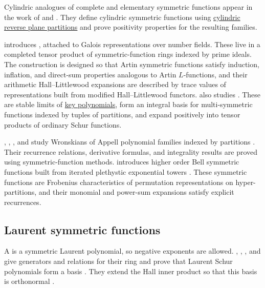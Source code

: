 Cylindric analogues of complete and elementary symmetric functions appear in
the work of  and 
\cite{KorffPalazzo2020}.  They define cylindric symmetric functions using
\hyperref[planePartitions]{cylindric reverse plane partitions} and prove
positivity properties for the resulting families.

 introduces
\label{artinSymmetricFunction}
\cite{Weising2024Artinx}, attached to Galois representations over number fields.
These live in a completed tensor product of symmetric-function rings indexed
by prime ideals.  The construction is designed so that Artin symmetric
functions satisfy induction, inflation, and direct-sum properties analogous
to Artin $L$-functions, and their arithmetic Hall--Littlewood expansions are
described by trace values of representations built from modified
Hall--Littlewood functors.
 also studies
\label{multiSymmetricSchurFunction}
\cite{Weising2025x}.  These are stable limits of \hyperref[key]{key polynomials},
form an integral basis for multi-symmetric functions indexed by tuples of
partitions, and expand positively into tensor products of ordinary Schur
functions.

, , , and
 study Wronskians of Appell polynomial families indexed
by partitions \cite{BonneuxHamakerStembridgeStevens2019}.  Their recurrence
relations, derivative formulas, and integrality results are proved using
symmetric-function methods.
 introduces higher
order Bell symmetric functions built from iterated plethystic exponential
towers \cite{Weising2025Bellx}.  These symmetric functions are Frobenius
characteristics of permutation representations on hyper-partitions, and their
monomial and power-sum expansions satisfy explicit recurrences.

\subsection[laurentSymmetricFunctions]{Laurent symmetric functions}

A \label{laurentSymmetricPolynomial} is a
symmetric Laurent polynomial, so negative exponents are allowed.
, , , and
 give generators and relations for their ring and
prove that Laurent Schur polynomials form a basis
\cite[Thm.~4.15]{FernandezKleinwortLiTorresDanta2026x}.  They extend the Hall
inner product so that this basis is orthonormal
\cite[Prop.~4.25]{FernandezKleinwortLiTorresDanta2026x}.

